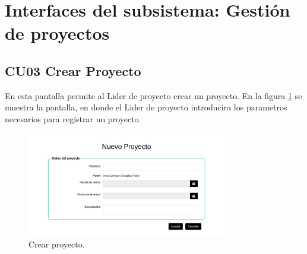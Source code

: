 
\section{Interfaces del subsistema: Gestión de proyectos}

\subsection{CU03 Crear Proyecto}
{
\justify
{}
}

\justify
En esta pantalla permite al Lider de proyecto crear un proyecto.
{
\justify
{}
}
\justify
En la figura \ref{fig:IU03} se muestra la pantalla, en donde el Lider de proyecto introducira los parametros necesarios para registrar un proyecto.

\begin{figure}[htb]
\centering
\includegraphics[width=0.8\textwidth]{./images/cu03-crear-proyecto.png}
\caption{Crear proyecto.} \label{fig:IU03}
\end{figure}